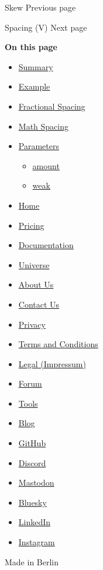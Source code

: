 { Skew } { Previous page }

\href{/docs/reference/layout/v/}{\pandocbounded{}}

{ Spacing (V) } { Next page }

\textbf{On this page}

\begin{itemize}
\tightlist
\item
  \hyperref[summary]{Summary}
\item
  \hyperref[example]{Example}
\item
  \hyperref[fractional-spacing]{Fractional Spacing}
\item
  \hyperref[math-spacing]{Math Spacing}
\item
  \hyperref[parameters]{Parameters}

  \begin{itemize}
  \tightlist
  \item
    \hyperref[parameters-amount]{amount}
  \item
    \hyperref[parameters-weak]{weak}
  \end{itemize}
\end{itemize}

\begin{itemize}
\tightlist
\item
  \href{/}{Home}
\item
  \href{/pricing/}{Pricing}
\item
  \href{/docs/}{Documentation}
\item
  \href{/universe/}{Universe}
\item
  \href{/about/}{About Us}
\item
  \href{/contact/}{Contact Us}
\item
  \href{/privacy/}{Privacy}
\item
  \href{https://typst.app/terms}{Terms and Conditions}
\item
  \href{/legal/}{Legal (Impressum)}
\end{itemize}

\begin{itemize}
\tightlist
\item
  \href{https://forum.typst.app}{Forum}
\item
  \href{/tools/}{Tools}
\item
  \href{/blog/}{Blog}
\item
  \href{https://github.com/typst/}{GitHub}
\item
  \href{https://discord.gg/2uDybryKPe}{Discord}
\item
  \href{https://mastodon.social/@typst}{Mastodon}
\item
  \href{https://bsky.app/profile/typst.app}{Bluesky}
\item
  \href{https://www.linkedin.com/company/typst/}{LinkedIn}
\item
  \href{https://instagram.com/typstapp/}{Instagram}
\end{itemize}

Made in Berlin
